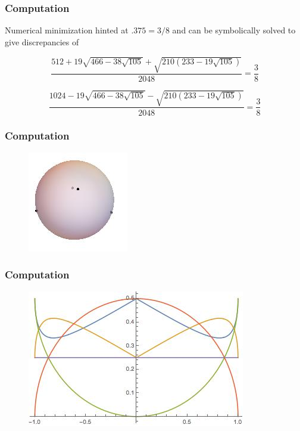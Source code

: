 \documentclass{beamer}
\theoremstyle{definition}
\begin{document}


\frame
{
\frametitle{Computation}
Numerical minimization hinted at $.375 = 3/8$ and can be symbolically solved to give discrepancies of

$$\frac{512+19 \sqrt{466-38 \sqrt{105}}+\sqrt{210
   \left(233-19 \sqrt{105}\right)}}{2048} = \frac{3}{8}
$$

$$\frac{1024-19 \sqrt{466-38 \sqrt{105}}-\sqrt{210
   \left(233-19 \sqrt{105}\right)}}{2048} = \frac{3}{8}$$
  }\frame
{
\frametitle{Computation} 
   \begin{figure}[htbp]
      \centering
      \includegraphics[scale=.5]{tetpoints.jpg} %

   \end{figure}
  }\frame
{
\frametitle{Computation} 
      \begin{figure}[htbp]
      \centering
      \includegraphics[scale=.5]{discrepancygraph.jpg} %

   \end{figure}
}


%
\end{document}
